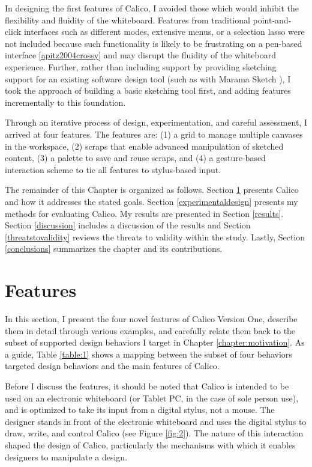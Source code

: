 \documentclass[12pt,fleqn]{ucithesis}
\begin{document}
In designing the first features of Calico, I avoided those which would inhibit the flexibility and fluidity of the whiteboard. Features from traditional point-and-click interfaces such as different modes, extensive menus, or a selection lasso were not included because such functionality is likely to be frustrating on a pen-based interface \ref{apitz2004crossy} and may disrupt the fluidity of the whiteboard experience. Further, rather than including support by providing sketching support for an existing software design tool (such as with Marama Sketch \cite{Grundy}), I took the approach of building a basic sketching tool first, and adding features incrementally to this foundation.

Through an iterative process of design, experimentation, and careful assessment, I arrived at four features. The features are: (1) a grid to manage multiple canvases in the workspace, (2) scraps that enable advanced manipulation of sketched content, (3) a palette to save and reuse scraps, and (4) a gesture-based interaction scheme to tie all features to stylus-based input.

The remainder of this Chapter is organized as follows. Section \ref{calico} presents Calico and how it addresses the stated goals. Section \ref{experimentaldesign} presents my methods for evaluating Calico. My results are presented in Section \ref{results}. Section \ref{discussion} includes a discussion of the results and Section \ref{threatstovalidity} reviews the threats to validity within the study. Lastly, Section \ref{conclusions} summarizes the chapter and its contributions.

\section{Features}
\label{calico}
In this section, I present the four novel features of Calico Version One, describe them in detail through various examples, and carefully relate them back to the subset of supported design behaviors I target in Chapter \ref{chapter:motivation}. As a guide, Table \ref{table:1} shows a mapping between the subset of four behaviors targeted design behaviors and the main features of Calico.

Before I discuss the features, it should be noted that Calico is intended to be used on an electronic whiteboard (or Tablet PC, in the case of sole person use), and is optimized to take its input from a digital stylus, not a mouse. The designer stands in front of the electronic whiteboard and uses the digital stylus to draw, write, and control Calico (see Figure \ref{fig:2}). The nature of this interaction shaped the design of Calico, particularly the mechanisms with which it enables designers to manipulate a design.
\end{document}

